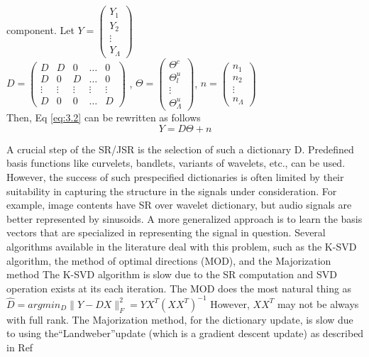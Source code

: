 component. Let  \( Y= \begin{pmatrix}
{Y}_{1}  \\ 
{Y}_{2}\\ 
\vdots\\
{Y}_{\Lambda }
\end{pmatrix} \)   \\   \(D= \begin{pmatrix}
D & D & 0 & \dots{} &0 \\ 
 D& 0 &D  & \dots{} & 0 \\ 
 \vdots{}& \vdots{}  &  \vdots{} & \vdots{}  & \vdots{} \\ 
 D& 0 & 0 & \dots{} & D 
\end{pmatrix} \) , \(\Theta=\begin{pmatrix}
{\Theta }^{c}\\ 
\Theta _{l}^{u}\\ 
 \vdots{}      \\ 
\Theta _{\Lambda }^{u}
\end{pmatrix}  \), \(n=\begin{pmatrix}
{n}_{1} \\ 
{n}_{2} \\ 
\vdots{} \\ 
{n}_{\Lambda }
\end{pmatrix} \) \\

Then, Eq \ref{eq:3.2} can be rewritten as follows
\begin{equation}
Y=D\Theta+n
\end{equation}

A crucial step of the SR/JSR is the selection of such a dictionary D. Predefined basis functions like curvelets, bandlets, variants of wavelets, etc., can be used. However, the success of such prespecified dictionaries is often limited by their suitability in capturing the structure in the signals under consideration. For example, image contents have SR over wavelet dictionary, but audio signals are better represented by sinusoids.  A more generalized approach is to learn the basis vectors that are specialized in representing the signal in question.  Several algorithms available in the literature deal with this problem, such as the K-SVD algorithm, the method of optimal directions (MOD), and the
Majorization method \cite{9,12,13} The K-SVD algorithm is slow
due to the SR computation and SVD operation exists at
its each iteration.
 \hfill \break
 The MOD does the most natural thing as \(\hat{D}=arg {min}_{D}\parallel Y-DX\parallel _{F}^{2}=Y{X}^{T} {\left(X{X}^{T}\right)}^{-1}\) However, \(X{X}^{T}\) may not be always with full rank. The Majorization method, for the dictionary update, is slow due to using the“Landweber”update (which is a gradient descent update)
as described in Ref \cite{14} 

